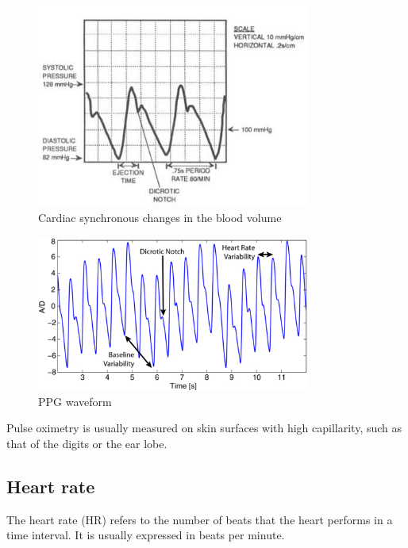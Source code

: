 \begin{figure}[!ht]
\centering
\includegraphics[width=0.8\textwidth]{images/BloodPressureWaveform.jpg}
\caption{Cardiac synchronous changes in the blood volume}
\label{fig:bloodpressure}
\end{figure}


\begin{figure}[!ht]
\centering
\includegraphics[width=0.8\textwidth]{images/PPGnaturalVariations.jpg}
\caption{PPG waveform}
\label{fig:PPGnatvars}
\end{figure}



Pulse oximetry is usually measured on skin surfaces with high capillarity, such as that of the digits or the ear lobe.


\subsection{Heart rate}
\label{subsec:setup:phys-signals:hr}

The heart rate (HR) refers to the number of beats that the heart performs in a time interval. It is usually expressed in beats per minute.

